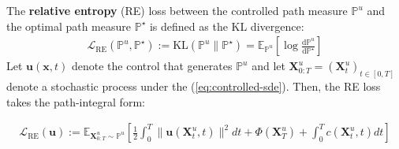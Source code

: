 \documentclass{article}
\begin{document}
\begin{definition}\label{def:relative-entropy}
    The \textbf{relative entropy} (RE) loss between the controlled path measure $\mathbb{P}^u$ and the optimal path measure $\mathbb{P}^\star$ is defined as the KL divergence:
    \begin{align}
        \mathcal{L}_{\text{RE}}(\mathbb{P}^u, \mathbb{P}^\star):=\text{KL}(\mathbb{P}^u\|\mathbb{P}^\star)=\mathbb{E}_{\mathbb{P}^u}\left[\log \frac{\mathrm{d}\mathbb{P}^u}{\mathrm{d}\mathbb{P}^\star}\right]\tag{Relative Entropy Objective}\label{eq:relative-entropy-path}
    \end{align}
    Let $\boldsymbol{u}(\boldsymbol{x},t)$ denote the control that generates $\mathbb{P}^u$ and let $\boldsymbol{X}^u_{0:T}=(\boldsymbol{X}^u_t)_{t\in [0,T]}$ denote a stochastic process under the (\ref{eq:controlled-sde}). Then, the RE loss takes the path-integral form:
    \begin{small}
    \begin{align}
        \mathcal{L}_{\text{RE}}(\boldsymbol{u}):=\mathbb{E}_{\boldsymbol{X}^u_{0:T}\sim \mathbb{P}^u}\left[\frac{1}{2}\int_0^T\|\boldsymbol{u}(\boldsymbol{X}^u_t,t)\|^2dt+\Phi(\boldsymbol{X}^u_T)+\int_0^Tc(\boldsymbol{X}^u_t,t)dt\right]\tag{RE Loss}\label{eq:relative-entropy-vector}
    \end{align}
    \end{small}
\end{definition}
\end{document}
